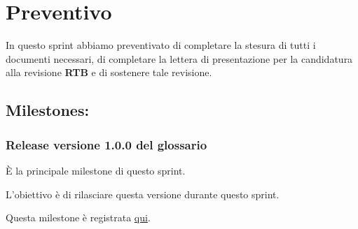 \section{Preventivo}

In questo sprint abbiamo preventivato di completare la stesura di tutti i documenti necessari, di completare la lettera di presentazione per la candidatura alla revisione \textbf{RTB} e di sostenere tale revisione.

\subsection{Milestones:}  
\subsubsection{Release versione 1.0.0 del glossario}

È la principale milestone di questo sprint.

L'obiettivo è di rilasciare questa versione durante questo sprint.

Questa milestone è registrata \href{https://github.com/SWEasabi/glossario/milestone/1}{qui}.
